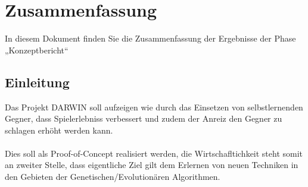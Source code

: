\section{Zusammenfassung}
In diesem Dokument finden Sie die Zusammenfassung der Ergebnisse der Phase „Konzeptbericht“

\subsection{Einleitung}
Das Projekt DARWIN soll aufzeigen wie durch das Einsetzen von selbstlernenden Gegner, dass Spielerlebniss verbessert und zudem der Anreiz den Gegner zu schlagen erhöht werden kann. 
\\ \\ 
Dies soll als Proof-of-Concept realisiert werden, die Wirtschafltichkeit steht somit an zweiter Stelle, dass eigentliche Ziel gilt dem Erlernen von neuen Techniken in den Gebieten der Genetischen/Evolutionären Algorithmen.  
